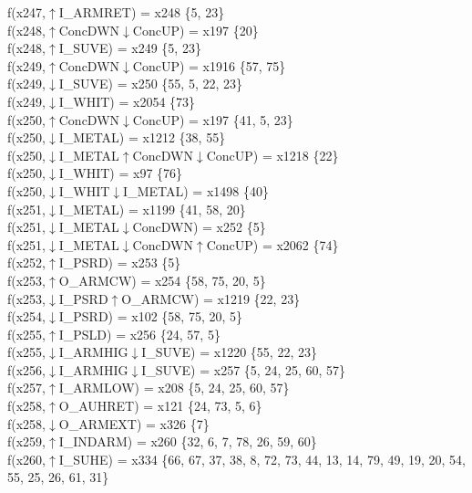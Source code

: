 f(x247,$\uparrow$I\_ARMRET) = x248 \{5, 23\} \\  
f(x248,$\uparrow$ConcDWN$\downarrow$ConcUP) = x197 \{20\} \\  
f(x248,$\uparrow$I\_SUVE) = x249 \{5, 23\} \\  
f(x249,$\uparrow$ConcDWN$\downarrow$ConcUP) = x1916 \{57, 75\} \\  
f(x249,$\downarrow$I\_SUVE) = x250 \{55, 5, 22, 23\} \\  
f(x249,$\downarrow$I\_WHIT) = x2054 \{73\} \\  
f(x250,$\uparrow$ConcDWN$\downarrow$ConcUP) = x197 \{41, 5, 23\} \\  
f(x250,$\downarrow$I\_METAL) = x1212 \{38, 55\} \\  
f(x250,$\downarrow$I\_METAL$\uparrow$ConcDWN$\downarrow$ConcUP) = x1218 \{22\} \\  
f(x250,$\downarrow$I\_WHIT) = x97 \{76\} \\  
f(x250,$\downarrow$I\_WHIT$\downarrow$I\_METAL) = x1498 \{40\} \\  
f(x251,$\downarrow$I\_METAL) = x1199 \{41, 58, 20\} \\  
f(x251,$\downarrow$I\_METAL$\downarrow$ConcDWN) = x252 \{5\} \\  
f(x251,$\downarrow$I\_METAL$\downarrow$ConcDWN$\uparrow$ConcUP) = x2062 \{74\} \\  
f(x252,$\uparrow$I\_PSRD) = x253 \{5\} \\  
f(x253,$\uparrow$O\_ARMCW) = x254 \{58, 75, 20, 5\} \\  
f(x253,$\downarrow$I\_PSRD$\uparrow$O\_ARMCW) = x1219 \{22, 23\} \\  
f(x254,$\downarrow$I\_PSRD) = x102 \{58, 75, 20, 5\} \\  
f(x255,$\uparrow$I\_PSLD) = x256 \{24, 57, 5\} \\  
f(x255,$\downarrow$I\_ARMHIG$\downarrow$I\_SUVE) = x1220 \{55, 22, 23\} \\  
f(x256,$\downarrow$I\_ARMHIG$\downarrow$I\_SUVE) = x257 \{5, 24, 25, 60, 57\} \\  
f(x257,$\uparrow$I\_ARMLOW) = x208 \{5, 24, 25, 60, 57\} \\  
f(x258,$\uparrow$O\_AUHRET) = x121 \{24, 73, 5, 6\} \\  
f(x258,$\downarrow$O\_ARMEXT) = x326 \{7\} \\  
f(x259,$\uparrow$I\_INDARM) = x260 \{32, 6, 7, 78, 26, 59, 60\} \\  
f(x260,$\uparrow$I\_SUHE) = x334 \{66, 67, 37, 38, 8, 72, 73, 44, 13, 14, 79, 49, 19, 20, 54, 55, 25, 26, 61, 31\} \\  
